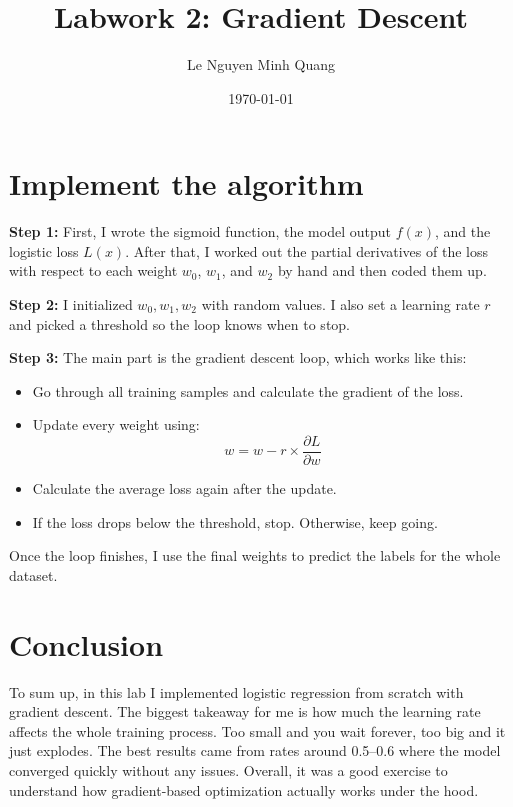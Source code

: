 \documentclass{article}
\title{Labwork 2: Gradient Descent}
\author{Le Nguyen Minh Quang}
\date{\today}
\begin{document}
\maketitle
\section{Implement the algorithm}

\textbf{Step 1:} First, I wrote the sigmoid function, the model output \(f(x)\), and the logistic loss \(L(x)\). After that, I worked out the partial derivatives of the loss with respect to each weight \(w_0\), \(w_1\), and \(w_2\) by hand and then coded them up.

\textbf{Step 2:} I initialized \(w_0, w_1, w_2\) with random values. I also set a learning rate \(r\) and picked a threshold so the loop knows when to stop.

\textbf{Step 3:} The main part is the gradient descent loop, which works like this:

\begin{itemize}
    \item Go through all training samples and calculate the gradient of the loss.
    
    \item Update every weight using:
    \[
    w = w - r \times \frac{\partial L}{\partial w}
    \]
    
    \item Calculate the average loss again after the update.
    
    \item If the loss drops below the threshold, stop. Otherwise, keep going.
\end{itemize}

Once the loop finishes, I use the final weights to predict the labels for the whole dataset.

\section{Conclusion}

To sum up, in this lab I implemented logistic regression from scratch with gradient descent. The biggest takeaway for me is how much the learning rate affects the whole training process. Too small and you wait forever, too big and it just explodes. The best results came from rates around 0.5--0.6 where the model converged quickly without any issues. Overall, it was a good exercise to understand how gradient-based optimization actually works under the hood.
\end{document}
